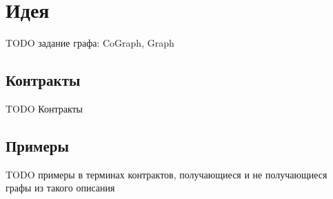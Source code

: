 \section{Идея}

TODO задание графа: CoGraph, Graph

\subsection{Контракты}

TODO Контракты

\subsection{Примеры}

TODO примеры в терминах контрактов, получающиеся и не получающиеся графы из такого описания
